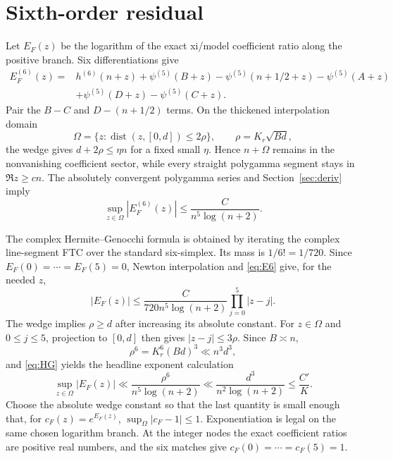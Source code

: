 \documentclass[11pt]{article}
\theoremstyle{definition}
\theoremstyle{remark}
\begin{document}
\section{Sixth-order residual}\label{sec:residual}

Let $E_F(z)$ be the logarithm of the exact xi/model coefficient ratio along
the positive branch.  Six differentiations give
\begin{align*}
E_F^{(6)}(z)={}&h^{(6)}(n+z)+\psi^{(5)}(B+z)
-\psi^{(5)}(n+1/2+z)-\psi^{(5)}(A+z)\\
&+\psi^{(5)}(D+z)-\psi^{(5)}(C+z).
\end{align*}
Pair the $B-C$ and $D-(n+1/2)$ terms.  On the thickened interpolation domain
\[
 \Omega=\{z:\operatorname{dist}(z,[0,d])\le2\rho\},\qquad
 \rho=K_r\sqrt{Bd},
\]
the wedge gives $d+2\rho\le\eta n$ for a fixed small $\eta$.  Hence
$n+\Omega$ remains in the nonvanishing coefficient sector, while every
straight polygamma segment stays in $\Re z\ge cn$.  The absolutely convergent
polygamma series and Section~\ref{sec:deriv} imply
\begin{equation}\label{eq:E6}
 \sup_{z\in\Omega}|E_F^{(6)}(z)|
 \le \frac{C}{n^5\log(n+2)}.
\end{equation}

The complex Hermite--Genocchi formula is obtained by iterating the complex
line-segment FTC over the standard six-simplex.  Its mass is $1/6!=1/720$.
Since $E_F(0)=\cdots=E_F(5)=0$, Newton interpolation and
\eqref{eq:E6} give, for the needed $z$,
\begin{equation}\label{eq:HG}
 |E_F(z)|\le \frac{C}{720n^5\log(n+2)}
       \prod_{j=0}^{5}|z-j|.
\end{equation}
The wedge implies $\rho\ge d$ after increasing its absolute constant.  For
$z\in\Omega$ and $0\le j\le5$, projection to $[0,d]$ then gives
$|z-j|\le3\rho$.  Since $B\asymp n$,
\[
 \rho^6=K_r^6(Bd)^3\ll n^3d^3,
\]
and \eqref{eq:HG} yields the headline exponent calculation
\begin{equation}\label{eq:exponent}
 \sup_{z\in\Omega}|E_F(z)|
 \ll\frac{\rho^6}{n^5\log(n+2)}
 \ll\frac{d^3}{n^2\log(n+2)}\le\frac{C'}K.
\end{equation}
Choose the absolute wedge constant so that the last quantity is small enough
that, for $c_F(z)=e^{E_F(z)}$,
$\sup_\Omega|c_F-1|\le1$.  Exponentiation is legal on the same chosen
logarithm branch.  At the integer nodes the exact coefficient ratios are
positive real numbers, and the six matches give
$c_F(0)=\cdots=c_F(5)=1$.
\end{document}
